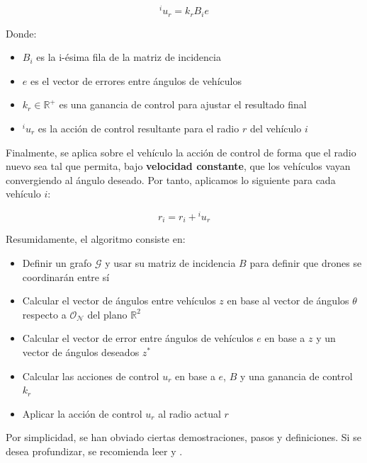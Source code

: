 \begin{equation} \label{eq:control-action-circular-formation}
    ^iu_r = k_r B_i e 
\end{equation}

Donde:

\begin{itemize}
    \item $B_i$ es la i-ésima fila de la matriz de incidencia
    \item $e$ es el vector de errores entre ángulos de vehículos
    \item $k_r \in \mathbb{R}^+$ es una ganancia de control para ajustar el resultado final  
    \item $^iu_r$ es la acción de control resultante para el radio $r$ del vehículo $i$
\end{itemize}

Finalmente, se aplica sobre el vehículo la acción de control de forma que el 
radio nuevo sea tal que permita, bajo \textbf{velocidad constante}, que los 
vehículos vayan convergiendo al ángulo deseado. 
Por tanto, aplicamos lo siguiente para cada vehículo $i$:

\begin{equation} \label{eq:applied-control-action-circular-formation}
    r_i = r_i + {^iu_r}
\end{equation}

Resumidamente, el algoritmo consiste en:

\begin{itemize}
    \item Definir un grafo $\mathcal{G}$ y usar su matriz de incidencia $B$ para definir que drones 
    se coordinarán entre sí
    \item Calcular el vector de ángulos entre vehículos $z$ en base al vector de ángulos $\theta$ respecto a 
    $\mathcal{O}_\mathcal{N}$ del plano $\mathbb{R}^2$
    \item Calcular el vector de error entre ángulos de vehículos $e$ en base a $z$ y 
    un vector de ángulos deseados $z^*$
    \item Calcular las acciones de control $u_r$ en base a $e$, $B$ y una ganancia de control $k_r$
    \item Aplicar la acción de control $u_r$ al radio actual $r$
\end{itemize}

Por simplicidad, se han obviado ciertas demostraciones, pasos y definiciones. 
Si se desea profundizar, se recomienda leer \cite{gvf-hector} y \cite{circular-formations}.

